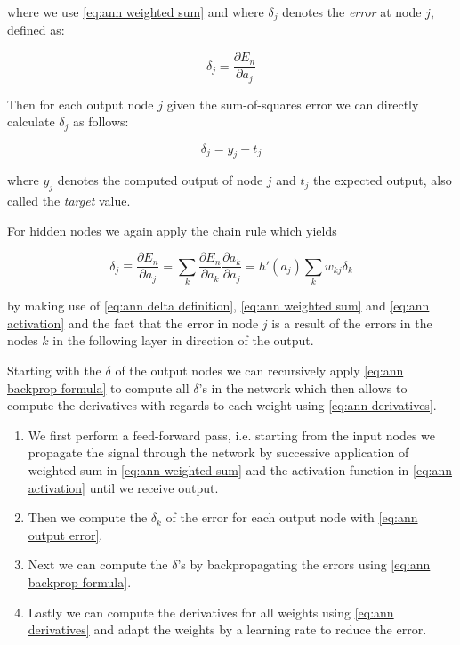 where we use \eqref{eq:ann weighted sum} and where $\delta_j$ denotes the \emph{error} at node $j$, defined as:

\begin{equation}
	\delta_j = \frac{\partial E_n}{\partial a_j}
	\label{eq:ann delta definition}
\end{equation}

Then for each output node $j$ given the sum-of-squares error we can directly calculate $\delta_j$ as follows:

\begin{equation}
	\delta_j = y_j - t_j
	\label{eq:ann output error}
\end{equation}

where $y_j$ denotes the computed output of node $j$ and $t_j$ the expected output, also called the \emph{target} value.

For hidden nodes we again apply the chain rule which yields

\begin{equation}
	\delta_j \equiv \frac{\partial E_n}{\partial a_j} = \sum_k \frac{\partial E_n}{\partial a_k} \frac{\partial a_k}{\partial a_j}
	= h'(a_j) \sum_k w_{kj}\delta_k
	\label{eq:ann backprop formula}
\end{equation}

by making use of \eqref{eq:ann delta definition}, \eqref{eq:ann weighted sum} and \eqref{eq:ann activation} and the fact that the error in node $j$ is a result of the errors in the nodes $k$ in the following layer in direction of the output.

Starting with the $\delta$ of the output nodes we can recursively apply \eqref{eq:ann backprop formula} to compute all $\delta$'s in the network which then allows to compute the derivatives with regards to each weight using \eqref{eq:ann derivatives}.

\begin{enumerate}
  \item We first perform a feed-forward pass, i.e. starting from the input nodes we propagate the signal through the network by successive application of weighted sum in \eqref{eq:ann weighted sum} and  the activation function in \eqref{eq:ann activation} until we receive output.
  \item Then we compute the $\delta_k$ of the error for each output node with \eqref{eq:ann output error}.
	\item Next we can compute the $\delta$'s by backpropagating the errors using \eqref{eq:ann backprop formula}.
	\item Lastly we can compute the derivatives for all weights using \eqref{eq:ann derivatives} and adapt the weights by a learning rate to reduce the error.
\end{enumerate}

